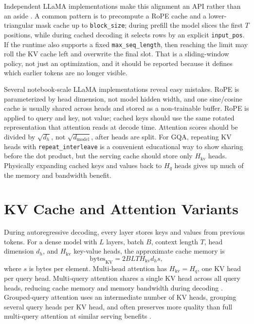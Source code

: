 Independent LLaMA implementations make this alignment an API rather than an aside \cite{lightning2023litllama}. A common pattern is to precompute a RoPE cache and a lower-triangular mask cache up to \texttt{block\_size}; during prefill the model slices the first $T$ positions, while during cached decoding it selects rows by an explicit \texttt{input\_pos}. If the runtime also supports a fixed \texttt{max\_seq\_length}, then reaching the limit may roll the KV cache left and overwrite the final slot. That is a sliding-window policy, not just an optimization, and it should be reported because it defines which earlier tokens are no longer visible.

Several notebook-scale LLaMA implementations reveal easy mistakes. RoPE is parameterized by head dimension, not model hidden width, and one sine/cosine cache is usually shared across heads and stored as a non-trainable buffer. RoPE is applied to query and key, not value; cached keys should use the same rotated representation that attention reads at decode time. Attention scores should be divided by $\sqrt{d_h}$, not $\sqrt{d_{\mathrm{model}}}$, after heads are split. For GQA, repeating KV heads with \texttt{repeat\_interleave} is a convenient educational way to show sharing before the dot product, but the serving cache should store only $H_{\mathrm{kv}}$ heads. Physically expanding cached keys and values back to $H_q$ heads gives up much of the memory and bandwidth benefit.

\section{KV Cache and Attention Variants}
\label{sec:llama-kv-cache-attention-variants}

During autoregressive decoding, every layer stores keys and values from previous tokens. For a dense model with $L$ layers, batch $B$, context length $T$, head dimension $d_h$, and $H_{\mathrm{kv}}$ key-value heads, the approximate cache memory is
\begin{equation}
  \mathrm{bytes}_{\mathrm{KV}}
  = 2BLT H_{\mathrm{kv}} d_h s,
  \label{eq:llama-kv-cache}
\end{equation}
where $s$ is bytes per element. Multi-head attention has $H_{\mathrm{kv}}=H_q$, one KV head per query head. Multi-query attention shares a single KV head across all query heads, reducing cache memory and memory bandwidth during decoding \cite{shazeer2019fast}. Grouped-query attention uses an intermediate number of KV heads, grouping several query heads per KV head, and often preserves more quality than full multi-query attention at similar serving benefits \cite{ainslie2023gqa}.

